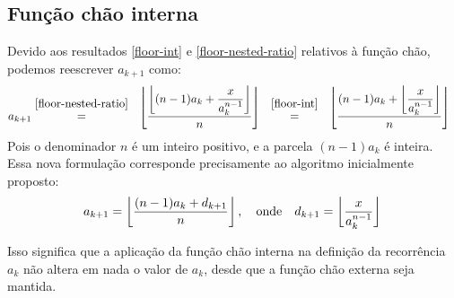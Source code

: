 \subsection*{Função chão interna}

Devido aos resultados \eqref{floor-int} e \eqref{floor-nested-ratio}
relativos à função chão,
podemos reescrever $a_{k+1}$ como:
\[
    a_{k+1}
  \stackfirst{\eqref{floor-nested-ratio}}{=}
    \bracketize[.75em]{\lfloor}{\rfloor}{
      \dfrac{\left\lfloor
               (n-1) a_k + \dfrac{x}{a_k^{n-1}}
             \right\rfloor}
            {n}
    }
  \stackfirst{\eqref{floor-int}}{=}
    \bracketize[.75em]{\lfloor}{\rfloor}{
      \dfrac{(n-1) a_k +
             \left\lfloor \dfrac{x}{a_k^{n-1}} \right\rfloor}
            {n}
    }
\]
Pois o denominador $n$ é um inteiro positivo,
e a parcela $(n - 1) a_k$ é inteira.
Essa nova formulação corresponde precisamente
ao algoritmo inicialmente proposto:
\[
  a_{k+1} = \left\lfloor \dfrac{(n-1) a_k + d_{k+1}}{n} \right\rfloor,
  \quad\text{onde}\quad
  d_{k+1} = \left\lfloor \dfrac{x}{a_k^{n-1}} \right\rfloor \\
\]

Isso significa que a aplicação da função chão interna
na definição da recorrência $a_k$ não altera em nada o valor de $a_k$,
desde que a função chão externa seja mantida.
